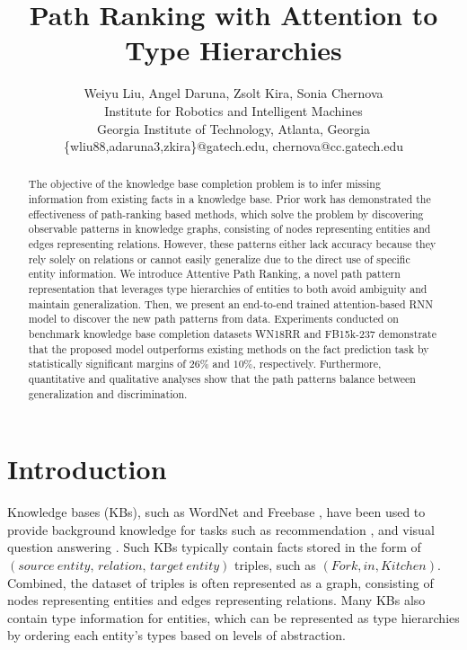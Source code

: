 \documentclass[letterpaper]{article} %
\title{Path Ranking with Attention to Type Hierarchies}
\author{Weiyu Liu, Angel Daruna, Zsolt Kira, Sonia Chernova\\
Institute for Robotics and Intelligent Machines\\
Georgia Institute of Technology, Atlanta, Georgia\\
\{wliu88,adaruna3,zkira\}@gatech.edu, chernova@cc.gatech.edu
}
\begin{document}
\maketitle

\begin{abstract}
The objective of the knowledge base completion problem is to infer missing information from existing facts in a knowledge base. Prior work has demonstrated the effectiveness of path-ranking based methods, which solve the problem by discovering observable patterns in knowledge graphs, consisting of nodes representing entities and edges representing relations. However, these patterns either lack accuracy because they rely solely on relations or cannot easily generalize due to the direct use of specific entity information. We introduce Attentive Path Ranking, a novel path pattern representation that leverages type hierarchies of entities to both avoid ambiguity and maintain generalization. Then, we present an end-to-end trained attention-based RNN model to discover the new path patterns from data. Experiments conducted on benchmark knowledge base completion datasets WN18RR and FB15k-237 demonstrate that the proposed model outperforms existing methods on the fact prediction task by statistically significant margins of $26\%$ and $10\%$, respectively. Furthermore, quantitative and qualitative analyses show that the path patterns balance between generalization and discrimination.
\end{abstract}

\section{Introduction}

Knowledge bases (KBs), such as WordNet \cite{wordnet} and Freebase \cite{freebase}, have been used to provide background knowledge for tasks such as recommendation \cite{wang2018dkn}, and visual question answering \cite{aditya2018explicit}. Such KBs typically contain facts stored in the form of $(source\:entity,\, relation,\, target \:entity)$ triples, such as $(Fork, in, Kitchen)$. Combined, the dataset of triples is often represented as a graph, consisting of nodes representing entities and edges representing relations. Many KBs also contain type information for entities, which can be represented as type hierarchies by ordering each entity's types based on levels of abstraction. 
\end{document}
